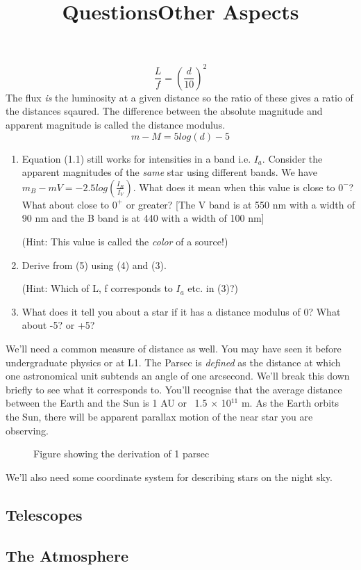 \begin{equation}
\frac{L}{f} = (\frac{d}{10})^{2}
\end{equation}
The flux \textit{is} the luminosity at a given distance so the ratio of these gives a ratio of the distances sqaured. The difference between the absolute magnitude and apparent magnitude is called the distance modulus. 
\begin{equation}
m - M = 5log(d) -5
\end{equation}
\title{\large{Questions}}
\begin{enumerate}
	\item Equation (1.1) still works for intensities in a band i.e. $I_{a}$. Consider the apparent magnitudes of the \textit{same} star using different bands. We have $m_{B} - m{V} = -2.5log(\frac{I_{B}}{I_{V}})$. What does it mean when this value is close to $0^{-}$? What about close to $0^{+}$ or greater? [The V band is at 550 nm with a width of 90 nm and the B band is at 440 with a width of 100 nm] \par (Hint: This value is called the \textit{color} of a source!)
	\item Derive from (5) using (4) and (3).\par (Hint: Which of L, f corresponds to $I_a$ etc. in (3)?) 
	\item What does it tell you about a star if it has a distance modulus of 0? What about -5? or +5? 
\end{enumerate}
\title{\large{Other Aspects}}
We'll need a common measure of distance as well. You may have seen it before undergraduate physics or at L1. The Parsec is \textit{defined} as the distance at which one astronomical unit subtends an angle of one arcsecond. We'll break this down briefly to see what it corresponds to. You'll recognise that the average distance between the Earth and the Sun is 1 AU or ~1.5 $\times$ 10${}^{11}$ m. As the Earth orbits the Sun, there will be apparent parallax motion of the near star you are observing.
\begin{figure}
\centering
{}
\caption{Figure showing the derivation of 1 parsec}
\end{figure}
We'll also need some coordinate system for describing stars on the night sky.











\subsection{Telescopes}
\subsection{The Atmosphere}
